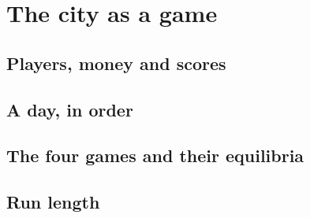 \section{The city as a game}
\label{sec:game}

\subsection{Players, money and scores}

\subsection{A day, in order}

\subsection{The four games and their equilibria}

\subsection{Run length}
